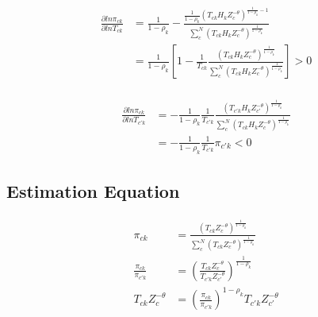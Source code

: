 \documentclass[10pt]{article}
\begin{document}
\begin{align*}
    \frac{\partial ln \pi_{ck}}{\partial ln T_{ck}} & = \frac{1}{1 - \rho_k} - \frac{\frac{1}{1 - \rho_k} (T_{ck} H_k Z_c^{- \theta})^{\frac{1}{1 - \rho_k} - 1}}{\sum_{c}^{N} (T_{ck} H_k Z_c^{-\theta})^{\frac{1}{1 - \rho_k}}}            \\
                                                    & = \frac{1}{1 - \rho_k} \left[1 - \frac{1}{T_{ck}} \frac{(T_{ck} H_k Z_c^{- \theta})^{\frac{1}{1 - \rho_k}}}{\sum_{c}^{N} (T_{ck} H_k Z_c^{-\theta})^{\frac{1}{1 - \rho_k}}}\right] > 0 \\
\end{align*}

\begin{align*}
    \frac{\partial ln \pi_{ck}}{\partial ln T_{c'k}} & = - \frac{1}{1 - \rho_k} \frac{1}{T_{c'k}} \frac{(T_{c'k} H_k Z_{c'}^{- \theta})^{\frac{1}{1 - \rho_k}}}{\sum_{c}^{N} (T_{ck} H_k Z_c^{-\theta})^{\frac{1}{1 - \rho_k}}} \\
                                                     & = - \frac{1}{1 - \rho_k} \frac{1}{T_{c'k}} \pi_{c'k} < 0
\end{align*}

\subsection{Estimation Equation}

\begin{align*}
    \pi_{ck}                   & = \frac{(T_{ck} Z_c^{-\theta})^{\frac{1}{1 - \rho_k}}}{\sum_{c}^{N} (T_{ck} Z_c^{-\theta})^{\frac{1}{1 - \rho_k}}} \\
    \frac{\pi_{ck}}{\pi_{c'k}} & = \left(\frac{T_{ck}Z_c^{- \theta}}{T_{c'k}Z_{c'}^{- \theta}}\right)^{\frac{1}{1 - \rho_k}}                        \\
    T_{ck} Z_c^{- \theta}      & = \left(\frac{\pi_{ck}}{\pi_{c'k}}\right)^{1 - \rho_k} T_{c'k} Z_{c'}^{- \theta}
\end{align*}

\end{document}
